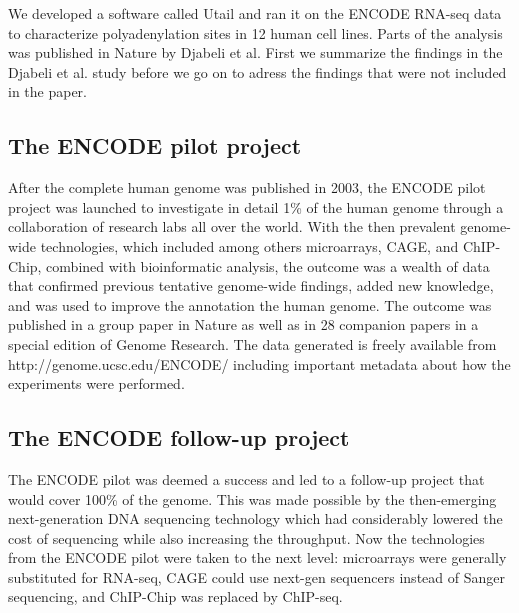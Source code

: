 %








We developed a software called Utail and ran it on the ENCODE RNA-seq data to
characterize polyadenylation sites in 12 human cell lines. Parts of the
analysis was published in Nature by Djabeli et al. First we summarize the
findings in the Djabeli et al. study before we go on to adress the findings that
were not included in the paper.

\subsection{The ENCODE pilot project}
After the complete human genome was published in 2003, the ENCODE pilot project
was launched to investigate in detail 1\% of the human genome through a
collaboration of research labs all over the world. With the then prevalent genome-wide
technologies, which included among others microarrays, CAGE, and ChIP-Chip,
combined with bioinformatic analysis, the outcome was a wealth of data that
confirmed previous tentative genome-wide findings, added new knowledge, and was
used to improve the annotation the human genome. The outcome was published in a
group paper in Nature \cite{birney_identification_2007} as well as in 28
companion papers in a special edition of Genome Research. The data generated
is freely available from http://genome.ucsc.edu/ENCODE/ including important
metadata about how the experiments were performed.

\subsection{The ENCODE follow-up project}
The ENCODE pilot was deemed a success and led to a follow-up project that would
cover 100\% of the genome. This was made possible by the then-emerging
next-generation DNA sequencing technology which had considerably lowered the
cost of sequencing while also increasing the throughput. Now the technologies
from the ENCODE pilot were taken to the next level: microarrays were generally
substituted for RNA-seq, CAGE could use next-gen sequencers instead of Sanger
sequencing, and ChIP-Chip was replaced by ChIP-seq.

